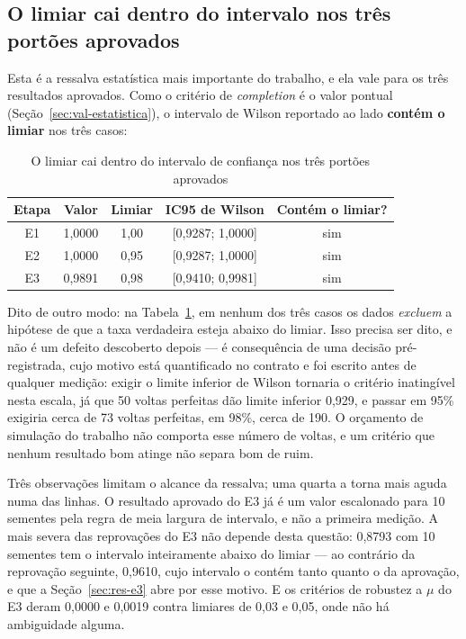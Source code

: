 \subsection{O limiar cai dentro do intervalo nos três portões aprovados}

Esta é a ressalva estatística mais importante do trabalho, e ela vale para os
três resultados aprovados. Como o critério de \textit{completion} é o valor
pontual (Seção~\ref{sec:val-estatistica}), o intervalo de Wilson reportado ao
lado \textbf{contém o limiar} nos três casos:

\begin{table}[h]
    \centering
    \begin{tabular}{|c|c|c|c|c|}
        \hline
        \textbf{Etapa} & \textbf{Valor} & \textbf{Limiar} & \textbf{IC95 de Wilson} &
        \textbf{Contém o limiar?} \\
        \hline
        E1 & 1,0000 & 1,00 & [0,9287; 1,0000] & sim \\
        \hline
        E2 & 1,0000 & 0,95 & [0,9287; 1,0000] & sim \\
        \hline
        E3 & 0,9891 & 0,98 & [0,9410; 0,9981] & sim \\
        \hline
    \end{tabular}
    \caption{O limiar cai dentro do intervalo de confiança nos três portões
    aprovados}
    \label{tab:val_ic}
\end{table}

Dito de outro modo: na Tabela~\ref{tab:val_ic}, em nenhum dos três casos os dados
\textit{excluem} a hipótese de
que a taxa verdadeira esteja abaixo do limiar. Isso precisa ser dito, e não é um
defeito descoberto depois --- é consequência de uma decisão pré-registrada, cujo
motivo está quantificado no contrato e foi escrito antes de qualquer medição:
exigir o limite inferior de Wilson tornaria o critério inatingível nesta escala,
já que 50 voltas perfeitas dão limite inferior 0,929, e passar em 95\% exigiria
cerca de 73 voltas perfeitas, em 98\%, cerca de 190. O orçamento de simulação do
trabalho não comporta esse número de voltas, e um critério que nenhum resultado
bom atinge não separa bom de ruim.

Três observações limitam o alcance da ressalva; uma quarta a torna mais aguda
numa das linhas. O resultado
aprovado do E3 já é um valor escalonado para 10 sementes pela regra de meia
largura de intervalo, e não a primeira medição. A mais severa das reprovações do
E3 não depende desta questão: 0,8793 com 10 sementes tem o intervalo inteiramente
abaixo do limiar --- ao contrário da reprovação seguinte, 0,9610, cujo intervalo
o contém tanto quanto o da aprovação, e que a Seção~\ref{sec:res-e3} abre por
esse motivo. E os critérios de robustez a $\mu$
do E3 deram 0,0000 e 0,0019 contra limiares de 0,03 e 0,05, onde não há
ambiguidade alguma.

